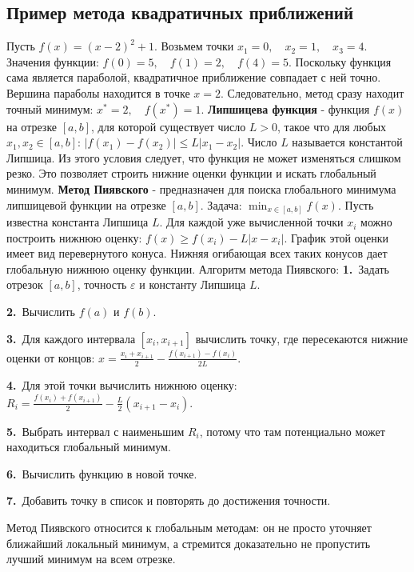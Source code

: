 \documentclass[12pt,a4paper]{article}
\begin{document}
\subsection{Пример метода квадратичных приближений}
Пусть $f(x)=(x-2)^2+1.$
Возьмем точки $x_1=0,\quad x_2=1,\quad x_3=4.$
Значения функции: $f(0)=5,\quad f(1)=2,\quad f(4)=5.$
Поскольку функция сама является параболой, квадратичное приближение совпадает с ней точно. Вершина параболы находится в точке $x=2.$
Следовательно, метод сразу находит точный минимум: $x^*=2,\quad f(x^*)=1.$
\textbf{Липшицева функция} - функция $f(x)$ на отрезке $[a,b]$, для которой существует число $L>0$, такое что для любых $x_1,x_2 \in [a,b]$: $|f(x_1)-f(x_2)| \le L |x_1-x_2|.$
Число $L$ называется константой Липшица.
Из этого условия следует, что функция не может изменяться слишком резко. Это позволяет строить нижние оценки функции и искать глобальный минимум.
\textbf{Метод Пиявского} - предназначен для поиска глобального минимума липшицевой функции на отрезке $[a,b]$.
Задача: $\min_{x \in [a,b]} f(x).$
Пусть известна константа Липшица $L$. Для каждой уже вычисленной точки $x_i$ можно построить нижнюю оценку: $f(x) \ge f(x_i) - L|x-x_i|.$
График этой оценки имеет вид перевернутого конуса. Нижняя огибающая всех таких конусов дает глобальную нижнюю оценку функции.
Алгоритм метода Пиявского:
\noindent\textbf{1.}\ Задать отрезок $[a,b]$, точность $\varepsilon$ и константу Липшица $L$.\par
\noindent\textbf{2.}\ Вычислить $f(a)$ и $f(b)$.\par
\noindent\textbf{3.}\ Для каждого интервала $[x_i,x_{i+1}]$ вычислить точку, где пересекаются нижние оценки от концов: $x = \frac{x_i+x_{i+1}}{2} - \frac{f(x_{i+1})-f(x_i)}{2L}.$\par
\noindent\textbf{4.}\ Для этой точки вычислить нижнюю оценку: $R_i = \frac{f(x_i)+f(x_{i+1})}{2} - \frac{L}{2}(x_{i+1}-x_i).$\par
\noindent\textbf{5.}\ Выбрать интервал с наименьшим $R_i$, потому что там потенциально может находиться глобальный минимум.\par
\noindent\textbf{6.}\ Вычислить функцию в новой точке.\par
\noindent\textbf{7.}\ Добавить точку в список и повторять до достижения точности.\par
Метод Пиявского относится к глобальным методам: он не просто уточняет ближайший локальный минимум, а стремится доказательно не пропустить лучший минимум на всем отрезке.
\end{document}
